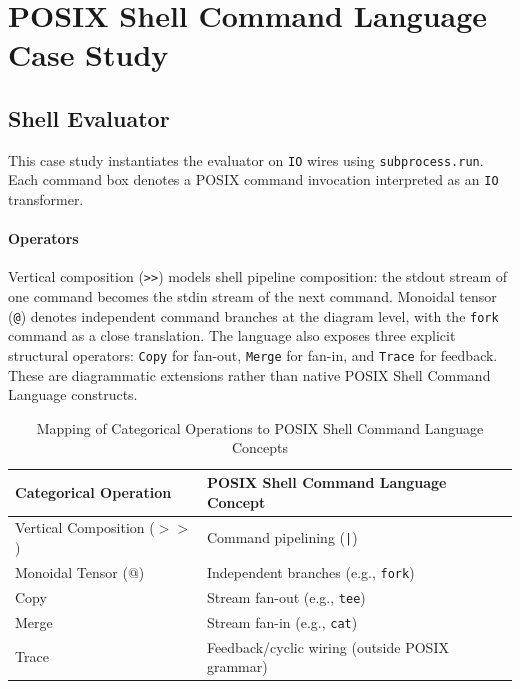 \documentclass[runningheads]{llncs}
\begin{document}
\section{POSIX Shell Command Language Case Study}

\subsection{Shell Evaluator}
This case study instantiates the evaluator on \texttt{IO} wires using \texttt{subprocess.run}. Each command box denotes a POSIX command invocation interpreted as an \texttt{IO} transformer.

\paragraph{Operators}
Vertical composition (\texttt{>>}) models shell pipeline composition: the stdout stream of one command becomes the stdin stream of the next command.
Monoidal tensor (\texttt{@}) denotes independent command branches at the diagram level, with the \texttt{fork} command as a close translation. The language also exposes three explicit structural operators: \texttt{Copy} for fan-out, \texttt{Merge} for fan-in, and \texttt{Trace} for feedback. These are diagrammatic extensions rather than native POSIX Shell Command Language constructs.

\begin{table}
\caption{Mapping of Categorical Operations to POSIX Shell Command Language Concepts}\label{tab1}
\centering
\begin{tabular}{|l|l|}
\hline
Categorical Operation & POSIX Shell Command Language Concept \\
\hline
Vertical Composition ($>>$) & Command pipelining (\texttt{|}) \\
Monoidal Tensor ($@$) & Independent branches (e.g., \texttt{fork}) \\
Copy & Stream fan-out (e.g., \texttt{tee}) \\
Merge & Stream fan-in (e.g., \texttt{cat}) \\
Trace & Feedback/cyclic wiring (outside POSIX grammar) \\
\hline
\end{tabular}
\end{table}
\end{document}

